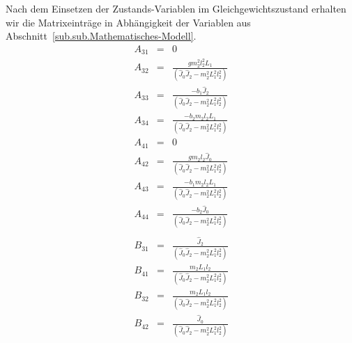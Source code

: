 Nach dem Einsetzen der Zustands-Variablen im Gleichgewichtszustand erhalten wir die Matrixeinträge in Abhängigkeit der Variablen aus Abschnitt~\ref{sub.sub.Mathematisches-Modell}.
\begin{eqnarray}
A_{31} &=& 0	\nonumber \\
A_{32} &=& \frac{gm^2_2l^2_2L_1}{(\hat{J}_0\hat{J}_2-m^2_2L^2_1l^2_2)}	\nonumber \\
A_{33} &=& \frac{-b_1\hat{J}_2}{(\hat{J}_0\hat{J}_2-m^2_2L^2_1l^2_2)}	\nonumber \\
A_{34} &=& \frac{-b_2m_2l_2L_1}{(\hat{J}_0\hat{J}_2-m^2_2L^2_1l^2_2)}	\nonumber \\
A_{41} &=& 0	\nonumber \\
A_{42} &=& \frac{gm_2l_2\hat{J}_0}{(\hat{J}_0\hat{J}_2-m^2_2L^2_1l^2_2)}	\nonumber \\
A_{43} &=& \frac{-b_1m_2l_2L_1}{(\hat{J}_0\hat{J}_2-m^2_2L^2_1l^2_2)}	\nonumber \\
A_{44} &=& \frac{-b_2\hat{J}_0}{(\hat{J}_0\hat{J}_2-m^2_2L^2_1l^2_2)}	\nonumber \\
\end{eqnarray}
\begin{eqnarray}
B_{31} &=& \frac{\hat{J}_2}{(\hat{J}_0\hat{J}_2-m^2_2L^2_1l^2_2)}	\nonumber \\
B_{41} &=& \frac{m_2L_1l_2}{(\hat{J}_0\hat{J}_2-m^2_2L^2_1l^2_2)}	\nonumber \\
B_{32} &=& \frac{m_2L_1l_2}{(\hat{J}_0\hat{J}_2-m^2_2L^2_1l^2_2)}	\nonumber \\
B_{42} &=& \frac{\hat{J}_0}{(\hat{J}_0\hat{J}_2-m^2_2L^2_1l^2_2)}	\nonumber \\
\end{eqnarray}

